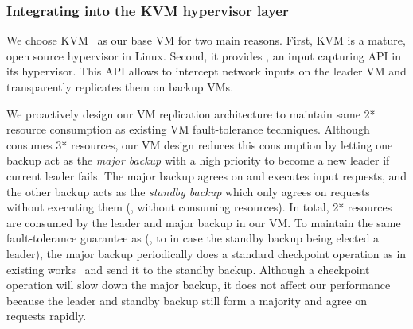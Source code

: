 
\vspace{-.15in}\subsubsection{Integrating \falcon into the KVM hypervisor 
layer} 
\label{sec:vm-arch}\vspace{-.075in}









We choose KVM~\cite{kvm} as our base VM for two main reasons. First, KVM 
is a mature, open source hypervisor in Linux. Second, it provides 
, an input capturing API in its hypervisor. This API allows 
\falcon to intercept network inputs on the leader VM and transparently 
replicates them on backup VMs.

We proactively design our VM replication architecture to maintain same 2* 
resource consumption as existing VM fault-tolerance techniques. Although \paxos 
consumes 3* resources, our VM design reduces this consumption by letting 
one backup act as the \emph{major backup} with a high priority to become a new 
leader if current leader fails. The major backup agrees on and executes input 
requests, and the other backup acts as the \emph{standby backup} which only 
agrees on requests without executing them (\ie, without consuming  
resources). In total, 2* resources are consumed by the leader and major 
backup in our VM. To maintain the same fault-tolerance guarantee as \paxos (\ie, 
to in case the standby backup being elected a leader), the major backup 
periodically does a standard checkpoint operation as in existing 
works~\cite{crane:sosp15,rex:eurosys14} and send it to the standby backup. 
Although a checkpoint operation will slow down the major backup, it does not 
affect our performance because the leader and standby backup still form a 
majority and agree on requests rapidly.

